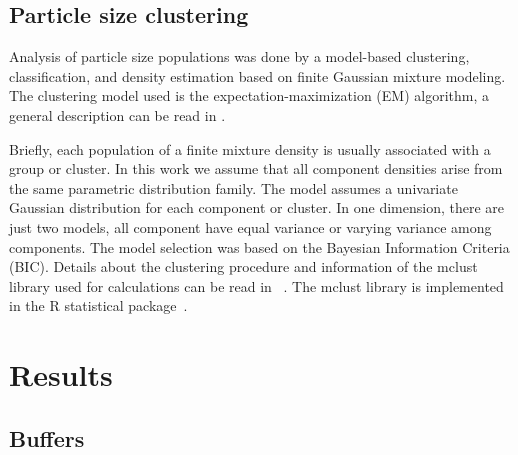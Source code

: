 \documentclass[journal=langd5,manuscript=article]{achemso}
\begin{document}



\subsection{Particle size clustering}




Analysis of particle size populations was done by    
a model-based clustering, classification, and density estimation based on
finite Gaussian mixture modeling.  The clustering model used is the 
expectation-maximization (EM) algorithm, a general description can be read in 
\citeauthor{Do2008}  
\citeyear{Do2008}
\cite{Do2008}.  

Briefly, each population of a finite  mixture density is usually associated with a group or cluster. In this work we assume that all component densities arise from the same parametric distribution family. The model assumes a univariate Gaussian distribution for each component or cluster. In one dimension, there are just two models, all component have equal variance or varying variance among components.
The model selection was based on the Bayesian Information Criteria (BIC).
Details about the clustering procedure and information of the mclust library used for calculations can be read in 
~\citeauthor{Fraley2012MclustEstimation}\cite{Fraley2012MclustEstimation}. The mclust library is implemented in the R statistical package~\cite{RCoreTeam2011}.





\section{Results}




\subsection{Buffers}
  
\end{document}
